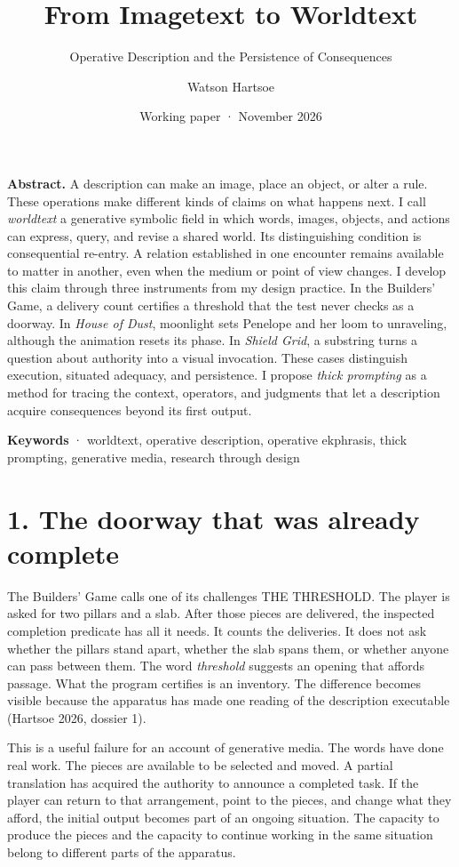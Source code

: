 \documentclass[
  11pt,
  letterpaper,
]{article}
\title{From Imagetext to Worldtext}
\subtitle{Operative Description and the Persistence of Consequences}
\author{Watson Hartsoe}
\date{Working paper · November 2026}
\begin{document}
\maketitle

\textbf{Abstract.} A description can make an image, place an object, or
alter a rule. These operations make different kinds of claims on what
happens next. I call \emph{worldtext} a generative symbolic field in
which words, images, objects, and actions can express, query, and revise
a shared world. Its distinguishing condition is consequential re-entry.
A relation established in one encounter remains available to matter in
another, even when the medium or point of view changes. I develop this
claim through three instruments from my design practice. In the
Builders' Game, a delivery count certifies a threshold that the test
never checks as a doorway. In \emph{House of Dust}, moonlight sets
Penelope and her loom to unraveling, although the animation resets its
phase. In \emph{Shield Grid}, a substring turns a question about
authority into a visual invocation. These cases distinguish execution,
situated adequacy, and persistence. I propose \emph{thick prompting} as
a method for tracing the context, operators, and judgments that let a
description acquire consequences beyond its first output.

\textbf{Keywords} · worldtext, operative description, operative
ekphrasis, thick prompting, generative media, research through design

\hypertarget{the-doorway-that-was-already-complete}{%
\section{1. The doorway that was already
complete}\label{the-doorway-that-was-already-complete}}

The Builders' Game calls one of its challenges THE THRESHOLD. The player
is asked for two pillars and a slab. After those pieces are delivered,
the inspected completion predicate has all it needs. It counts the
deliveries. It does not ask whether the pillars stand apart, whether the
slab spans them, or whether anyone can pass between them. The word
\emph{threshold} suggests an opening that affords passage. What the
program certifies is an inventory. The difference becomes visible
because the apparatus has made one reading of the description executable
(Hartsoe 2026, dossier 1).

This is a useful failure for an account of generative media. The words
have done real work. The pieces are available to be selected and moved.
A partial translation has acquired the authority to announce a completed
task. If the player can return to that arrangement, point to the pieces,
and change what they afford, the initial output becomes part of an
ongoing situation. The capacity to produce the pieces and the capacity
to continue working in the same situation belong to different parts of
the apparatus.
\end{document}
